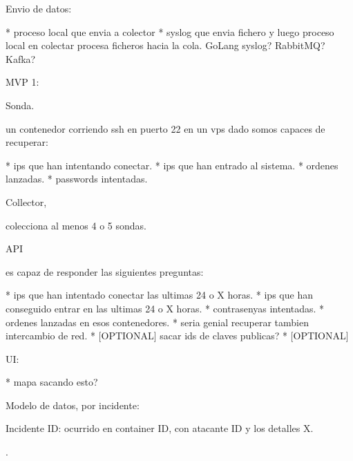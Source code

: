 Envio de datos:

* proceso local que envia a colector
* syslog que envia fichero y luego proceso local en colectar procesa ficheros hacia la cola.
  GoLang syslog? RabbitMQ? Kafka?


 MVP 1:

Sonda.

 un contenedor corriendo ssh en puerto 22 en un vps dado somos capaces de recuperar:

 * ips que han intentando conectar.
 * ips que han entrado al sistema.
 * ordenes lanzadas.
 * passwords intentadas.

 Collector,

 colecciona al menos 4 o 5 sondas.

 API

 es capaz de responder las siguientes preguntas:

 * ips que han intentado conectar las ultimas 24 o X horas.
 * ips que han conseguido entrar en las ultimas 24 o X horas.
 * contrasenyas intentadas.
 * ordenes lanzadas en esos contenedores.
 * seria genial recuperar tambien intercambio de red.
 * [OPTIONAL] sacar ids de claves publicas?
 * [OPTIONAL]

UI:

 * mapa sacando esto?


 Modelo de datos, por incidente:

 Incidente ID:
   ocurrido en container ID, con atacante ID y los detalles X.


 .


